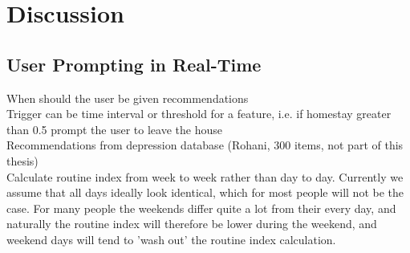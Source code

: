 \chapter{Discussion}
\label{chapter:07}


   



\section{User Prompting in Real-Time}
When should the user be given recommendations\\
Trigger can be time interval or threshold for a feature, i.e. if homestay greater than 0.5 prompt the user to leave the house\\
Recommendations from depression database (Rohani, 300 items, not part of this thesis)\\

Calculate routine index from week to week rather than day to day. Currently we assume that all days ideally look identical, which for most people will not be the case. For many people the weekends differ quite a lot from their every day, and naturally the routine index will therefore be lower during the weekend, and weekend days will tend to 'wash out' the routine index calculation. 